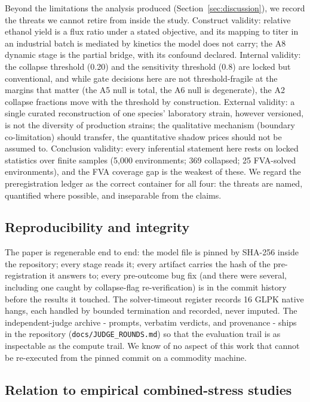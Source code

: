\documentclass[12pt]{article}
\begin{document}
Beyond the limitations the analysis produced
(Section~\ref{sec:discussion}), we record the threats we cannot
retire from inside the study. Construct validity: relative ethanol
yield is a flux ratio under a stated objective, and its mapping to
titer in an industrial batch is mediated by kinetics the model does
not carry; the A8 dynamic stage is the partial bridge, with its
confound declared. Internal validity: the collapse threshold (0.20)
and the sensitivity threshold (0.8) are locked but conventional, and
while gate decisions here are not threshold-fragile at the margins
that matter (the A5 null is total, the A6 null is degenerate), the
A2 collapse fractions move with the threshold by construction.
External validity: a single curated reconstruction of one species'
laboratory strain, however versioned, is not the diversity of
production strains; the qualitative mechanism (boundary co-limitation)
should transfer, the quantitative shadow prices should not be assumed
to. Conclusion validity: every inferential statement here rests on
locked statistics over finite samples (5{,}000 environments; 369
collapsed; 25 FVA-solved environments), and the FVA coverage gap is
the weakest of these. We regard the preregistration ledger as the
correct container for all four: the threats are named, quantified
where possible, and inseparable from the claims.

\subsection{Reproducibility and integrity}

The paper is regenerable end to end: the model file is pinned by
SHA-256 inside the repository; every stage reads it; every artifact
carries the hash of the pre-registration it answers to; every
pre-outcome bug fix (and there were several, including one caught by
collapse-flag re-verification) is in the commit history before the
results it touched. The solver-timeout register records 16 GLPK native
hangs, each handled by bounded termination and recorded, never
imputed. The independent-judge archive - prompts, verbatim verdicts,
and provenance - ships in the repository (\texttt{docs/JUDGE\_ROUNDS.md})
so that the evaluation trail is as inspectable as the compute trail.
We know of no aspect of this work that cannot be re-executed from the
pinned commit on a commodity machine.


\subsection{Relation to empirical combined-stress studies}
\end{document}
